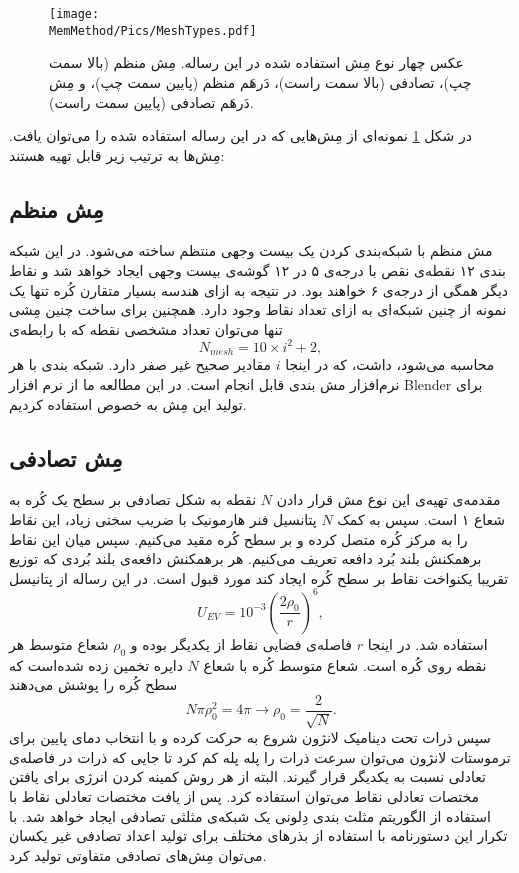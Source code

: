 \begin{figure}[h]
\begin{center}
\texttt{[image: \\MemMethod/Pics/MeshTypes.pdf]}
\caption{
عکس چهار نوع مِش استفاده شده در این رساله. مِش منظم (بالا سمت چپ)، تصادفی (بالا سمت راست)، دَرهَم منظم (پایین سمت چپ)، و مِش دَرهَم تصادفی (پایین سمت راست).
}
\label{fig:meshTypesMesthod}
\end{center}
\end{figure}
در شکل
\ref{fig:meshTypesMesthod}
نمونه‌ای از مِش‌هایی که در این رساله استفاده شده را می‌توان یافت. مِش‌ها به ترتیب زیر قابل تهیه هستند:
\subsection{
مِش منظم
}
مش منظم با شبکه‌‌بندی کردن یک بیست وجهی منتظم ساخته می‌شود. در این شبکه‌ بندی ۱۲ نقطه‌ی نقص با درجه‌ی ۵ در ۱۲ گوشه‌ی بیست وجهی ایجاد خواهد شد و نقاط دیگر همگی از درجه‌ی ۶ خواهند بود. در نتیجه به ازای هندسه بسیار متقارن کُره تنها یک نمونه از چنین شبکه‌ای به ازای تعداد نقاط وجود دارد. همچنین  برای ساخت چنین مِشی تنها می‌توان  تعداد مشخصی نقطه که با رابطه‌ی 
\begin{equation}
N_{mesh}=10\times i^2+2,
\end{equation}
محاسبه می‌شود، داشت،  که در اینجا 
$i$
مقادیر صحیح غیر صفر دارد. ‌شبکه‌ بندی با هر نرم‌افزار مش بندی قابل انجام است. در این مطالعه ما از نرم افزار 
Blender
برای تولید این مِش به خصوص استفاده کردیم. 

\subsection{
مِش تصادفی
}
مقدمه‌ی تهیه‌ی این نوع مش  قرار دادن 
$N$
نقطه به شکل تصادفی بر سطح یک کُره‌ به شعاع ۱ است. سپس به کمک 
$N$
پتانسیل فنر هارمونیک با ضریب سختی زیاد، این نقاط را به مرکز کُره متصل کرده و بر سطح کُره مقید می‌کنیم. سپس میان این نقاط برهمکنش بلند بُرد دافعه تعریف می‌کنیم. هر برهمکنش دافعه‌ی بلند بُردی که  توزیع تقریبا یکنواخت نقاط بر سطح کُره ایجاد کند مورد قبول است. در این رساله از پتانیسل 
\begin{equation}
U_{EV}=10^{-3}\left(\frac{2\rho_0}{r}\right)^6,
\end{equation}
استفاده شد. در اینجا 
$r$
فاصله‌ی فضایی نقاط از یکدیگر بوده و 
$\rho_0$
شعاع متوسط هر نقطه روی کُره است. شعاع متوسط کُره با شعاع 
$N$
دایره تخمین زده شده‌است که  سطح کُره را پوشش می‌دهند
\begin{equation}
N\pi\rho_0^2=4\pi\rightarrow \rho_0=\frac{2}{\sqrt{N}}.
\end{equation} 
سپس ذرات تحت دینامیک لانژون شروع به حرکت کرده و با انتخاب دمای پایین برای ترموستات لانژون می‌توان سرعت ذرات را پله پله کم کرد تا جایی که ذرات در فاصله‌ی تعادلی نسبت به یکدیگر قرار گیرند. البته از هر روش کمینه کردن انرژی
برای یافتن مختصات تعادلی نقاط می‌توان استفاده کرد. پس از یافت مختصات تعادلی نقاط با استفاده از الگوریتم مثلث‌ بندی دِلونی
\cite{DelaunayTriangulation1997}
یک شبکه‌ی مثلثی تصادفی ایجاد خواهد شد. با تکرار این دستورنامه با استفاده از بذر‌های
 مختلف برای تولید اعداد تصادفی غیر یکسان می‌توان مِش‌های تصادفی متفاوتی تولید کرد.

